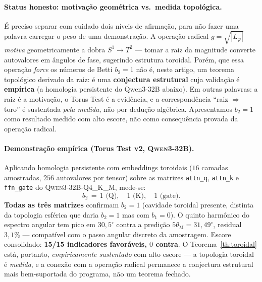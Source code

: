 \documentclass[12pt,a4paper]{article}
\newcommand{\thetaM}{\theta_{\text{M}}}
\newcommand{\Lphi}{L_{\varphi}}
\begin{document}
\paragraph{Status honesto: motivação geométrica vs.\ medida topológica.}
É preciso separar com cuidado dois níveis de afirmação, para não fazer uma
palavra carregar o peso de uma demonstração.  A operação radical
$g = \sqrt{|\Lphi|}$ \emph{motiva} geometricamente a dobra $S^1 \to T^2$ ---
tomar a raiz da magnitude converte autovalores em ângulos de fase, sugerindo
estrutura toroidal.  Porém, que essa operação \emph{force} os números de Betti
$b_2 = 1$ não é, neste artigo, um teorema topológico derivado da raiz: é uma
\textbf{conjectura estrutural} cuja validação é \textbf{empírica} (a homologia
persistente do Qwen3-32B abaixo).  Em outras palavras: a raiz é a motivação, o
Torus Test é a evidência, e a correspondência ``raiz $\Rightarrow$ toro'' é
sustentada \emph{pela medida}, não por dedução algébrica.  Apresentamos
$b_2 = 1$ como resultado medido com alto escore, não como consequência provada
da operação radical.

\paragraph{Demonstração empírica (Torus Test v2, \textsc{Qwen3-32B}).}
Aplicando homologia persistente com embeddings toroidais ($16$ camadas
amostradas, $256$ autovalores por tensor) sobre as matrizes
\texttt{attn\_q}, \texttt{attn\_k} e \texttt{ffn\_gate} do
\textsc{Qwen3-32B-Q4\_K\_M}, mede-se:
\begin{equation}
b_{2} \,=\, 1 \text{ (Q)}, \quad
1 \text{ (K)}, \quad
1 \text{ (gate)}.
\end{equation}
\textbf{Todas as três matrizes} confirmam $b_{2} = 1$ (cavidade toroidal
presente, distinta da topologia esférica que daria $b_{2} = 1$ mas com
$b_{1} = 0$).  O quinto harmônico do espectro angular tem pico em
$30{,}5^{\circ}$ contra a predição $5\thetaM = 31{,}49^{\circ}$,
residual $3{,}1\%$ --- compatível com o passo angular
discreto da amostragem.  Escore consolidado: \textbf{15/15
indicadores favoráveis, $0$ contra}.  O Teorema~\ref{th:toroidal} está,
portanto, \emph{empiricamente sustentado} com alto escore --- a topologia
toroidal é \emph{medida}, e a conexão com a operação radical permanece a
conjectura estrutural mais bem-suportada do programa, não um teorema fechado.
\end{document}
